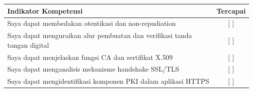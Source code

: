 \documentclass[../main.tex]{subfiles}
\begin{document}
\begin{competencychecklist}
\begin{tabularx}{\linewidth}{|X|c|}
\hline
Indikator Kompetensi & Tercapai \\
\hline
Saya dapat membedakan otentikasi dan non-repudiation & [ ] \\
\hline
Saya dapat menguraikan alur pembuatan dan verifikasi tanda tangan digital & [ ] \\
\hline
Saya dapat menjelaskan fungsi CA dan sertifikat X.509 & [ ] \\
\hline
Saya dapat menganalisis mekanisme handshake SSL/TLS & [ ] \\
\hline
Saya dapat mengidentifikasi komponen PKI dalam aplikasi HTTPS & [ ] \\
\hline
\end{tabularx}
\end{competencychecklist}
\end{document}
